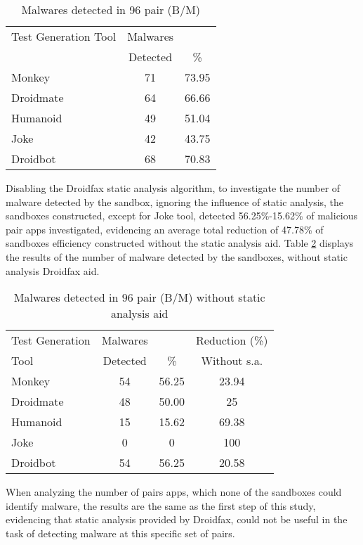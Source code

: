 \begin{table}[ht]
\centering
\begin{tabular}{lcc}\toprule
 Test Generation Tool & Malwares & \\
 & Detected & \% \\ \midrule
 Monkey & 71 & 73.95 \\
 Droidmate & 64 &  66.66  \\
 Humanoid & 49 & 51.04  \\
 Joke & 42 & 43.75  \\
 Droidbot & 68 & 70.83  \\\midrule
 
\end{tabular} 
\caption{Malwares detected in 96 pair (B/M)}
\label{tab:malware}
\end{table}

Disabling the Droidfax static analysis algorithm, to investigate the number of malware detected by the sandbox, ignoring the influence of static analysis, the sandboxes constructed, except for Joke tool, detected 56.25\%-15.62\% of malicious pair apps investigated, evidencing an average total reduction of 47.78\% of sandboxes efficiency constructed without the static analysis aid. Table \ref{tab:malwareWithout} displays the results of the number of malware detected by the sandboxes, without static analysis Droidfax aid. 

\begin{table}[ht]
\centering
\begin{tabular}{lccc}\toprule
 Test Generation & Malwares & & Reduction (\%)\\
 Tool & Detected & \% & Without s.a.\\ \midrule
 Monkey & 54 & 56.25 & 23.94\\
 Droidmate & 48 &  50.00 & 25 \\
 Humanoid & 15 & 15.62 & 69.38  \\
 Joke & 0 & 0 & 100 \\
 Droidbot & 54 & 56.25 & 20.58  \\\midrule
 
\end{tabular} 
\caption{Malwares detected in 96 pair (B/M) without static analysis aid}
\label{tab:malwareWithout}
\end{table}


When analyzing the number of pairs apps, which none of the sandboxes could identify malware, the results are the same as the first step of this study, evidencing that static analysis provided by Droidfax, could not be useful in the task of detecting malware at this specific set of pairs.

